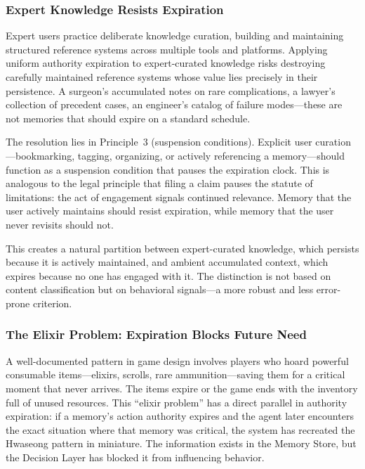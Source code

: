 \documentclass[12pt]{article}
\begin{document}
\subsubsection{Expert Knowledge Resists Expiration}
\label{sec:expert-knowledge}

Expert users practice deliberate knowledge curation, building and maintaining structured reference systems across multiple tools and platforms. Applying uniform authority expiration to expert-curated knowledge risks destroying carefully maintained reference systems whose value lies precisely in their persistence. A surgeon's accumulated notes on rare complications, a lawyer's collection of precedent cases, an engineer's catalog of failure modes---these are not memories that should expire on a standard schedule.

The resolution lies in Principle~3 (suspension conditions). Explicit user curation---bookmarking, tagging, organizing, or actively referencing a memory---should function as a suspension condition that pauses the expiration clock. This is analogous to the legal principle that filing a claim pauses the statute of limitations: the act of engagement signals continued relevance. Memory that the user actively maintains should resist expiration, while memory that the user never revisits should not.

This creates a natural partition between expert-curated knowledge, which persists because it is actively maintained, and ambient accumulated context, which expires because no one has engaged with it. The distinction is not based on content classification but on behavioral signals---a more robust and less error-prone criterion.

\subsubsection{The Elixir Problem: Expiration Blocks Future Need}
\label{sec:elixir-problem}

A well-documented pattern in game design involves players who hoard powerful consumable items---elixirs, scrolls, rare ammunition---saving them for a critical moment that never arrives. The items expire or the game ends with the inventory full of unused resources. This ``elixir problem'' has a direct parallel in authority expiration: if a memory's action authority expires and the agent later encounters the exact situation where that memory was critical, the system has recreated the Hwaseong pattern in miniature. The information exists in the Memory Store, but the Decision Layer has blocked it from influencing behavior.
\end{document}
